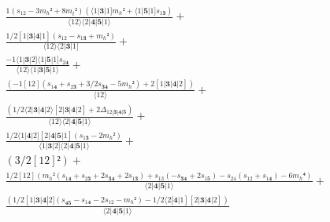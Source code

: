 \documentclass[varwidth, border=5pt]{standalone}
\begin{document}
\begin{my}
$\begin{gathered}
\scriptscriptstyle\frac{1(s_{12}-3m_h²+8m_t²)(⟨1|𝟑|1]m_h²+⟨1|𝟓|1]s_{1𝟑})}{⟨12⟩⟨2|𝟒|𝟓|1⟩} +\\
\scriptscriptstyle\frac{1/2[1|𝟑|𝟒|1](s_{12}-s_{1𝟑}+m_h²)}{⟨12⟩⟨2|𝟑|1]} +\\
\scriptscriptstyle\frac{-1⟨1|𝟑|2]⟨1|𝟓|1]s_{2𝟒}}{⟨12⟩⟨1|𝟑|𝟓|1⟩} +\\
\scriptscriptstyle\frac{(-1[12](s_{1𝟒}+s_{2𝟑}+3/2s_{𝟑𝟒}-5m_h²)+2[1|𝟑|𝟒|2])}{⟨12⟩} +\\
\scriptscriptstyle\frac{(1/2⟨2|𝟑|𝟒|2⟩[2|𝟑|𝟒|2]+2Δ_{12|𝟑|𝟒|𝟓})}{⟨12⟩⟨2|𝟒|𝟓|1⟩} +\\
\scriptscriptstyle\frac{1/2⟨1|𝟒|2][2|𝟒|𝟓|1](s_{1𝟑}-2m_h²)}{⟨1|𝟑|2]⟨2|𝟒|𝟓|1⟩} +\\
\scriptscriptstyle (3/2[12]²) +\\
\scriptscriptstyle\frac{1/2[12](m_h²(s_{1𝟒}+s_{2𝟑}+2s_{𝟑𝟒}+2s_{1𝟑})+s_{13}(-s_{𝟑𝟒}+2s_{1𝟓})-s_{24}(s_{12}+s_{1𝟒})-6m_h⁴)}{⟨2|𝟒|𝟓|1⟩} +\\
\scriptscriptstyle\frac{(1/2[1|𝟑|𝟒|2](s_{𝟒𝟓}-s_{1𝟒}-2s_{12}-m_h²)-1/2⟨2|𝟒|1][2|𝟑|𝟒|2])}{⟨2|𝟒|𝟓|1⟩} \phantom{+}
\end{gathered}$
\end{my}
\end{document}
